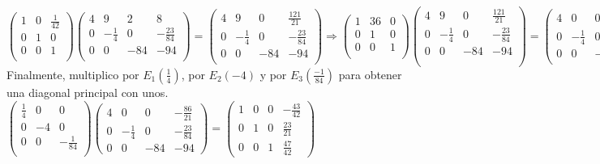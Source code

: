 \documentclass[11pt, a4paper]{article}
\newif\IfInSansMode
\theoremstyle{theorem-style}
\theoremstyle{definition-style}
\theoremstyle{remark-style}
\theoremstyle{example-style}
\begin{document}
$\begin{pmatrix}
1 & 0 & \frac{1}{42} \\
0 & 1 & 0 \\
0 & 0 & 1 \\
\end{pmatrix}  
\begin{pmatrix}
4 & 9 & 2 & 8\\
0 & -\frac{1}{4} & 0 & -\frac{23}{84}\\
0 & 0 & -84 & -94 \\
\end{pmatrix} = 
\begin{pmatrix}
4 & 9 & 0 & \frac{121}{21}\\
0 & -\frac{1}{4} & 0 & -\frac{23}{84}\\
0 & 0 & -84 & -94 \\
\end{pmatrix} \Longrightarrow
\begin{pmatrix}
1 & 36 & 0 \\
0 & 1 & 0 \\
0 & 0 & 1 \\
\end{pmatrix}   
\begin{pmatrix}
4 & 9 & 0 & \frac{121}{21}\\
0 & -\frac{1}{4} & 0 & -\frac{23}{84}\\
0 & 0 & -84 & -94 \\ \\
\end{pmatrix} = 
\begin{pmatrix}
4 & 0 & 0 & -\frac{86}{21}\\
0 & -\frac{1}{4} & 0 & -\frac{23}{84}\\
0 & 0 & -84 & -94 \\
\end{pmatrix}$ \\

Finalmente, multiplico por $E_1(\frac{1}{4})$, por $E_2(-4)$ y por $E_3(\frac{-1}{84})$ para obtener una diagonal principal con unos. \\

$\begin{pmatrix}
\frac{1}{4} & 0 & 0 \\
0 & -4 & 0 \\
0 & 0 & -\frac{1}{84} \\
\end{pmatrix}    
\begin{pmatrix}
4 & 0 & 0 & -\frac{86}{21}\\
0 & -\frac{1}{4} & 0 & -\frac{23}{84}\\
0 & 0 & -84 & -94 
\end{pmatrix} = 
\begin{pmatrix}
1 & 0 & 0 & -\frac{43}{42}\\
0 & 1 & 0 & \frac{23}{21}\\
0 & 0 & 1 & \frac{47}{42} 
\end{pmatrix}$ \\
\end{document}
